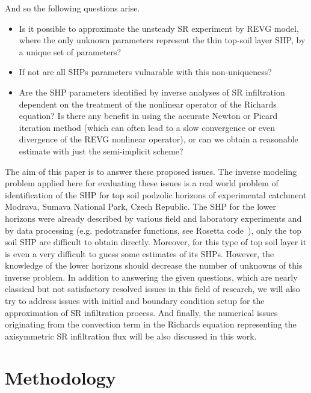 \documentclass[review]{elsarticle}
\begin{document}
And so the following questions arise. 
\begin{itemize}
\item Is it possible to approximate the unsteady SR experiment by REVG model, where the only unknown parameters represent the thin top-soil layer SHP, by a unique set of parameters? \
\item If not are all SHPs parameters vulnarable with this non-uniqueness?
\item Are the SHP parameters identified by inverse analyses of SR infiltration dependent on the treatment of the nonlinear operator of the Richards equation? Is there any benefit in using the accurate Newton or Picard iteration method (which can often lead to a slow convergence or even divergence of the REVG nonlinear operator), or can we obtain a reasonable estimate with just the semi-implicit scheme?
\end{itemize}



The aim of this paper is to answer these proposed issues. The inverse modeling problem applied here for evaluating these issues is  a real world problem of identification of the SHP  for top soil podzolic horizons of experimental catchment Modrava, Sumava National Park, Czech Republic.  The SHP for the lower horizons were already described by various field and laboratory experiments and by data processing (e.g. pedotransfer functions, see Rosetta code~\citep{Schaap}), only the top soil SHP are difficult to  obtain directly. Moreover, for this type of top soil layer it is even a very difficult to guess some estimates of its SHPs. However, the knowledge of the lower horizons should decrease the number of unknowns of this inverse problem. In addition to answering the given questions, which are nearly classical but not satisfactory resolved issues in this field of research, we will also try to address issues with initial and boundary condition setup for the approximation of SR infiltration process. And finally, the numerical issues originating from the convection term in the Richards equation representing the axisymmetric SR infiltration flux will be also discussed in this work.









\section{Methodology}%
\label{metodo}
\end{document}
